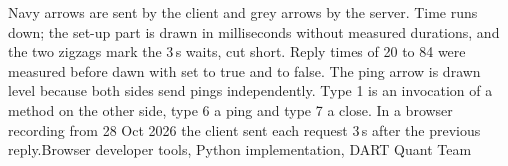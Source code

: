 {
}{Navy arrows are sent by the client and grey arrows by the server. Time runs down; the set-up part is drawn in milliseconds without measured durations, and the two zigzags mark the 3\,s waits, cut short. Reply times of 20 to 84\ms{} were measured before dawn with  set to true and to false. The ping arrow is drawn level because both sides send pings independently. Type 1 is an invocation of a method on the other side, type 6 a ping and type 7 a close. In a browser recording from 28 Oct 2026 the client sent each request 3\,s after the previous reply.}{Browser developer tools, Python implementation, DART Quant Team}
